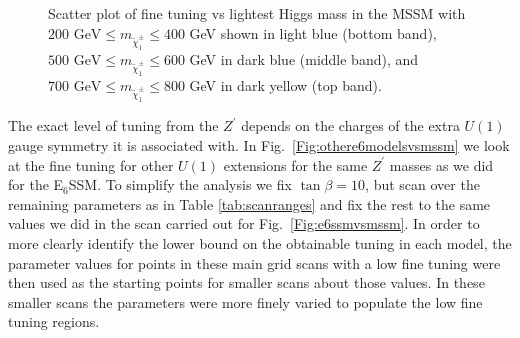 \documentclass[preprint,amsmath,amssymb,aps,superscriptaddress,prd,
showpacs,floatfix,nofootinbib]{revtex4-1}
\begin{document}
\begin{figure}[h]
\begin{center}
\caption{Scatter plot of fine tuning vs lightest Higgs mass in the MSSM with
$200 \textrm{ GeV} \leq m_{\tilde{\chi}^\pm_1} \leq 400$ GeV shown in light
blue (bottom band), $500 \textrm{ GeV} \leq m_{\tilde{\chi}^\pm_1} \leq 600$
GeV in dark blue (middle band), and $700 \textrm { GeV} \leq
m_{\tilde{\chi}^\pm_1} \leq 800$ GeV in dark yellow (top band).}
\label{Fig:chargino-plot}
\end{center}
\end{figure}

The exact level of tuning from the $Z^\prime$ depends on the charges
of the extra $U(1)$ gauge symmetry it is associated with.  In
Fig.~\ref{Fig:othere6modelsvsmssm} we look at the fine tuning for
other $U(1)$ extensions for the same $Z^\prime$ masses as we did for the
E$_6$SSM.  To simplify the analysis we fix $\tan\beta = 10$, but scan
over the remaining parameters as in Table \ref{tab:scanranges} and fix
the rest to the same values we did in the scan carried out for
Fig.~\ref{Fig:e6ssmvsmssm}.  In order to more clearly identify the lower bound
on the obtainable tuning in each model, the parameter values for points in
these main grid scans with a low fine tuning were then used as the starting
points for smaller scans about those values.  In these smaller scans the
parameters were more finely varied to populate the low fine tuning regions.
\end{document}
